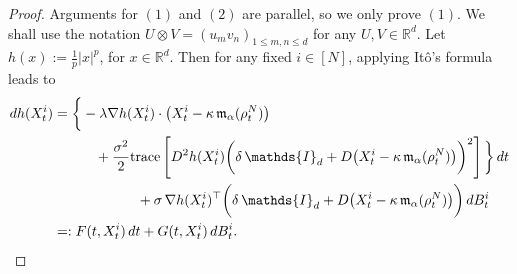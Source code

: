 \documentclass[12pt]{amsart}
\newcommand{\rd}{{\rm d} }
\numberwithin{equation}{section}
\begin{document}
\begin{proof}
Arguments for $(1)$ and $(2)$ are parallel, so we only prove $(1)$. We shall use the notation $U\otimes V = (u_{m}v_{n})_{1\leq m,n\leq d}$ for any $U,V \in \mathbb{R}^{d}$.  Let $h(x):=\frac{1}{p}|x|^{p}$, for $x\in \mathbb{R}^{d}$. Then for any fixed $i\in[N]$, applying It\^{o}'s formula leads to
\begin{align*}
    \rd h(X^{i}_{t}) & = \bigg\{ -\lambda \nabla h(X^{i}_{t})\cdot \big(X^{i}_{t} - \kappa \, \mathfrak{m}_{\alpha}(\rho^{N}_{t})\big) \\
    & \quad \quad \quad + \frac{\sigma^{2}}{2} \text{trace}\left[D^{2}h(X^{i}_{t}) \bigg( \delta\,\mathds{I}_{d} + D\big(X^{i}_{t} - \kappa\,\mathfrak{m}_{\alpha}(\rho^{N}_{t})\big) \bigg)^{2} \right] \bigg\}\,\rd t \\
    & \quad \quad \quad \quad \quad \quad + \sigma\,\nabla h(X^{i}_{t})^{\top}\bigg( \delta\,\mathds{I}_{d} + D\big(X^{i}_{t} - \kappa\,\mathfrak{m}_{\alpha}(\rho^{N}_{t})\big) \bigg)\, \rd B^{i}_{t}\\
    & =: F(t,X_{t}^{i})\,\rd t + G(t,X_{t}^{i})\,\rd B^{i}_{t}.
\end{align*}


\end{proof}
\end{document}
